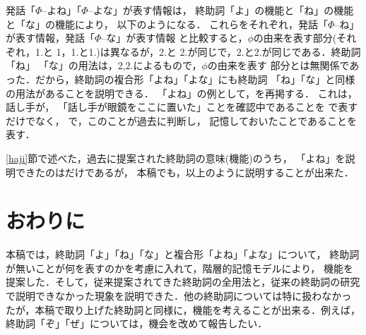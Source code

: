 発話「\(\Phi\)--よね」「\(\Phi\)--よな」が表す情報は，
終助詞「よ」の機能と「ね」の機能と「な」の機能により，
以下のようになる．
これらをそれぞれ，発話「\(\Phi\)--ね」が表す情報，発話「\(\Phi\)--な」が表す情報
と比較すると，\(\phi\)の由来を表す部分(それぞれ，1.と
1，1.と1.)は異なるが，2.と
2.が同じで，2.と2.が同じである．終助詞「ね」
「な」の用法は，2,2.によるもので，\(\phi\)の由来を表す
部分とは無関係であった．だから，終助詞の複合形「よね」「よな」にも終助詞
「ね」「な」と同様の用法があることを説明できる．
「よね」の例として，を再掲する．
これは，話し手が，
「話し手が眼鏡をここに置いた」ことを確認中であることを
で表すだけでなく，
で，このことが過去に判断し，
記憶しておいたことであることを表す．

\ref{haji}節で述べた，過去に提案された終助詞の意味(機能)のうち，
「よね」を説明できたのは\cite{kinsui93,kinsui93-3}だけであるが，
本稿でも，以上のように説明することが出来た．


\section{おわりに} \label{conclusion} 
本稿では，終助詞「よ」「ね」「な」と複合形「よね」「よな」について，
終助詞が無いことが何を表すのかを考慮に入れて，階層的記憶モデルにより，
機能を提案した．そして，従来提案されてきた終助詞の全用法と，従来の終助詞の研究
で説明できなかった現象を説明できた．他の終助詞については特に扱わなかっ
たが，本稿で取り上げた終助詞と同様に，機能を考えることが出来る．例えば，
終助詞「ぞ」「ぜ」については，機会を改めて報告したい．
\nocite{kamio90}

